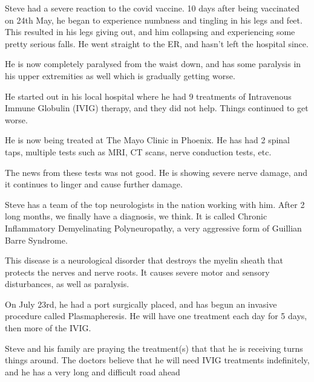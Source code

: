 Steve had a severe reaction to the covid vaccine. 10 days after being vaccinated
on 24th May, he began to experience numbness and tingling in his legs and
feet. This resulted in his legs giving out, and him collapsing and experiencing
some pretty serious falls. He went straight to the ER, and hasn’t left the
hospital since.

He is now completely paralysed from the waist down, and has some paralysis in
his upper extremities as well which is gradually getting worse.

He started out in his local hospital where he had 9 treatments of Intravenous
Immune Globulin (IVIG) therapy, and they did not help. Things continued to get
worse.

He is now being treated at The Mayo Clinic in Phoenix. He has had 2 spinal taps,
multiple tests such as MRI, CT scans, nerve conduction tests, etc.

The news from these tests was not good. He is showing severe nerve damage, and
it continues to linger and cause further damage.

Steve has a team of the top neurologists in the nation working with him. After 2
long months, we finally have a diagnosis, we think. It is called Chronic
Inflammatory Demyelinating Polyneuropathy, a very aggressive form of Guillian
Barre Syndrome.

This disease is a neurological disorder that destroys the myelin sheath that
protects the nerves and nerve roots. It causes severe motor and sensory
disturbances, as well as paralysis.

On July 23rd, he had a port surgically placed, and has begun an invasive
procedure called Plasmapheresis. He will have one treatment each day for 5 days,
then more of the IVIG.

Steve and his family are praying the treatment(s) that that he is receiving
turns things around. The doctors believe that he will need IVIG treatments
indefinitely, and he has a very long and difficult road ahead

